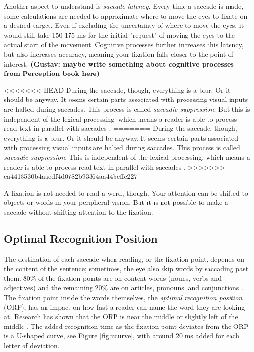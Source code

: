 Another aspect to understand is \textit{saccade latency}. Every time a saccade is made, some calculations are needed to approximate where to move the eyes to fixate on a desired target. Even if excluding the uncertainty of where to move the eyes, it would still take 150-175 ms for the initial "request" of moving the eyes to the actual start of the movement. Cognitive processes further increases this latency, but also increases accuracy, meaning your fixation falls closer to the point of interest.
\textbf{
(Gustav: maybe write something about cognitive processes from Perception book here)}

<<<<<<< HEAD
During the saccade, though, everything is a blur. Or it should be anyway. It seems certain parts associated with processing visual inputs are halted during saccades. This process is called \textit{saccadic suppression}. But this is independent of the lexical processing, which means a reader is able to process read text in parallel with saccades \cite{eyeMovement}.
=======
During the saccade, though, everything is a blur. Or it should be anyway. It seems certain parts associated with processing visual inputs are halted during saccades. This process is called \textit{saccadic suppression}. This is independent of the lexical processing, which means a reader is able to process read text in parallel with saccades \cite{eyeMovement}.
>>>>>>> ca4418530b4aaedf4d0782b93364aa44beffc227

A fixation is not needed to read a word, though. Your attention can be shifted to objects or words in your peripheral vision. But it is not possible to make a saccade without shifting attention to the fixation.

\subsection{Optimal Recognition Position} \label{ORP}
The destination of each saccade when reading, or the fixation point, depends on the content of the sentence; sometimes, the eye also skip words by saccading past them. 80\% of the fixation points are on content words (nouns, verbs and adjectives) and the remaining 20\% are on articles, pronouns, and conjunctions \cite{eysenck_cognitive_2010}. The fixation point inside the words themselves, the \textit{optimal recognition position} (ORP), has an impact on how fast a reader can name the word they are looking at. Research has shown that the ORP is near the middle or slightly left of the middle \cite{oregan_optimal_1992, nazir_letter_1998, oregan_convenient_1984}. The added recognition time as the fixation point deviates from the ORP is a U-shaped curve, see Figure \ref{fig:ucurve}, with around 20 ms added for each letter of deviation.

